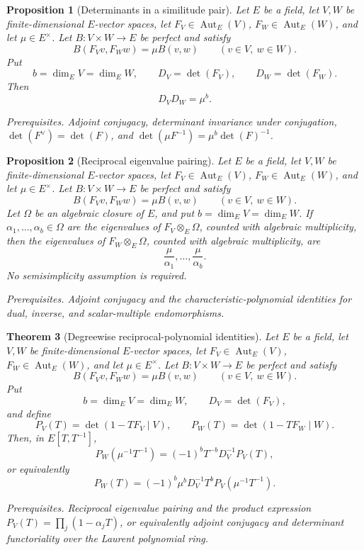\documentclass[10pt]{article}
\newtheorem{theorem}{Theorem}[section]
\newtheorem{proposition}[theorem]{Proposition}
\theoremstyle{definition}
\newcommand{\deps}[1]{\par\smallskip\noindent\textit{Prerequisites.} #1}
\begin{document}
\begin{proposition}[Determinants in a similitude pair]
Let \(E\) be a field, let \(V,W\) be finite-dimensional \(E\)-vector
spaces, let \(F_V\in\operatorname{Aut}_E(V)\),
\(F_W\in\operatorname{Aut}_E(W)\), and let \(\mu\in E^\times\).  Let
\(B:V\times W\to E\) be perfect and satisfy
\[
 B(F_Vv,F_Ww)=\mu B(v,w)
 \qquad(v\in V,\ w\in W).
\]
Put
\[
 b=\dim_EV=\dim_EW,\qquad
 D_V=\det(F_V),\qquad D_W=\det(F_W).
\]
Then
\[
 D_VD_W=\mu^b.
\]
\deps{Adjoint conjugacy, determinant invariance under conjugation,
\(\det(F^\vee)=\det(F)\), and
\(\det(\mu F^{-1})=\mu^b\det(F)^{-1}\).}
\end{proposition}

\begin{proposition}[Reciprocal eigenvalue pairing]
Let \(E\) be a field, let \(V,W\) be finite-dimensional \(E\)-vector
spaces, let \(F_V\in\operatorname{Aut}_E(V)\),
\(F_W\in\operatorname{Aut}_E(W)\), and let \(\mu\in E^\times\).  Let
\(B:V\times W\to E\) be perfect and satisfy
\[
 B(F_Vv,F_Ww)=\mu B(v,w)
 \qquad(v\in V,\ w\in W).
\]
Let \(\Omega\) be an algebraic closure of \(E\), and put
\(b=\dim_EV=\dim_EW\).  If
\(\alpha_1,\ldots,\alpha_b\in\Omega\) are the eigenvalues of
\(F_V\otimes_E\Omega\), counted with algebraic multiplicity, then the
eigenvalues of \(F_W\otimes_E\Omega\), counted with algebraic multiplicity,
are
\[
 \frac{\mu}{\alpha_1},\ldots,\frac{\mu}{\alpha_b}.
\]
No semisimplicity assumption is required.
\deps{Adjoint conjugacy and the characteristic-polynomial identities for
dual, inverse, and scalar-multiple endomorphisms.}
\end{proposition}

\begin{theorem}[Degreewise reciprocal-polynomial identities]
Let \(E\) be a field, let \(V,W\) be finite-dimensional \(E\)-vector
spaces, let \(F_V\in\operatorname{Aut}_E(V)\),
\(F_W\in\operatorname{Aut}_E(W)\), and let \(\mu\in E^\times\).  Let
\(B:V\times W\to E\) be perfect and satisfy
\[
 B(F_Vv,F_Ww)=\mu B(v,w)
 \qquad(v\in V,\ w\in W).
\]
Put
\[
 b=\dim_EV=\dim_EW,\qquad D_V=\det(F_V),
\]
and define
\[
 P_V(T)=\det(1-TF_V\mid V),\qquad
 P_W(T)=\det(1-TF_W\mid W).
\]
Then, in \(E[T,T^{-1}]\),
\[
 P_W(\mu^{-1}T^{-1})
 =(-1)^bT^{-b}D_V^{-1}P_V(T),
\]
or equivalently
\[
 P_W(T)=(-1)^b\mu^bD_V^{-1}T^b
 P_V(\mu^{-1}T^{-1}).
\]
\deps{Reciprocal eigenvalue pairing and the product expression
\(P_V(T)=\prod_j(1-\alpha_jT)\), or equivalently adjoint conjugacy and
determinant functoriality over the Laurent polynomial ring.}
\end{theorem}
\end{document}
